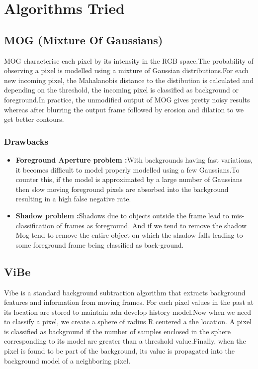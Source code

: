 \documentclass[12pt,a4paper]{article}
\begin{document}
\section{Algorithms Tried}
\subsection{MOG (Mixture Of Gaussians)}
MOG characterise each pixel by its intensity in the RGB space.The probability of observing a pixel is modelled using a mixture of Gaussian distributions.For each new incoming pixel, the Mahalanobis distance to the distibution is calculated and depending on the threshold, the incoming pixel is classified as background or foreground.In practice, the unmodified output of MOG gives pretty noisy results whereas after blurring the output frame followed by erosion and dilation to we get better contours. 
\subsubsection{Drawbacks}
\begin{itemize}
\item {\bf Foreground Aperture problem :}With backgrounds having fast variations, it becomes difficult to model properly modelled using a few Gaussians.To counter this, if the model is approximated by a large number of Gaussians then slow moving foreground pixels are absorbed into the background resulting in a high false negative rate. 
\item {\bf Shadow problem :}Shadows due to objects outside the frame lead to mis-classification of frames as foreground. And if we tend to remove the shadow Mog tend to remove the entire object on which the shadow falls leading to some foreground frame being classified as back-ground.
\end{itemize} 
\subsection{ViBe}
Vibe is a standard background subtraction algorithm that extracts background features and information from moving frames.
For each pixel values in the past at  its location are stored to maintain adn develop  history model.Now when we need to classify a pixel, we create a sphere of radius R centered a the location. A pixel is classified as background if the number of samples enclosed in the sphere corresponding to its model are greater than a threshold value.Finally, when the pixel is found to be part of the background, its value is propagated into the background model of a neighboring pixel. 
\end{document}

